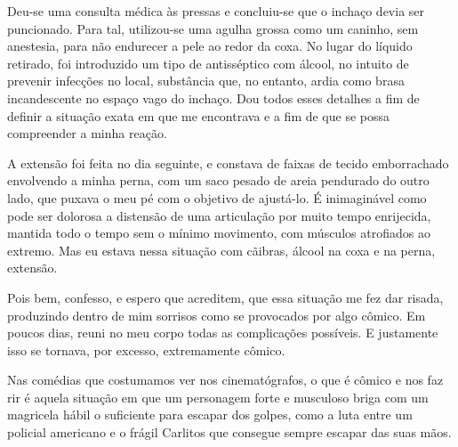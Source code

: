 
Deu-se uma consulta médica às pressas e concluiu-se que o inchaço devia
ser puncionado. Para tal, utilizou-se uma agulha grossa como um caninho,
sem anestesia, para não endurecer a pele ao redor da coxa. No lugar do
líquido retirado, foi introduzido um tipo de antisséptico com álcool, no
intuito de prevenir infecções no local, substância que, no entanto,
ardia como brasa incandescente no espaço vago do inchaço. Dou todos
esses detalhes a fim de definir a situação exata em que me encontrava e
a fim de que se possa compreender a minha reação.


A extensão foi feita no dia seguinte, e constava de faixas de tecido
emborrachado envolvendo a minha perna, com um saco pesado de areia
pendurado do outro lado, que puxava o meu pé com o objetivo de
ajustá-lo. É inimaginável como pode ser dolorosa a distensão de uma
articulação por muito tempo enrijecida, mantida todo o tempo sem o
mínimo movimento, com músculos atrofiados ao extremo. Mas eu estava
nessa situação com cãibras, álcool na coxa e na perna, extensão.

Pois bem, confesso, e espero que acreditem, que essa situação me fez dar
risada, produzindo dentro de mim sorrisos como se provocados por algo
cômico. Em poucos dias, reuni no meu corpo todas as complicações
possíveis. E justamente isso se tornava, por excesso, extremamente
cômico.

Nas comédias que costumamos ver nos cinematógrafos, o que é cômico e nos
faz rir é aquela situação em que um personagem forte e musculoso briga
com um magricela hábil o suficiente para escapar dos golpes, como a luta
entre um policial americano e o frágil Carlitos que consegue sempre
escapar das suas mãos.

